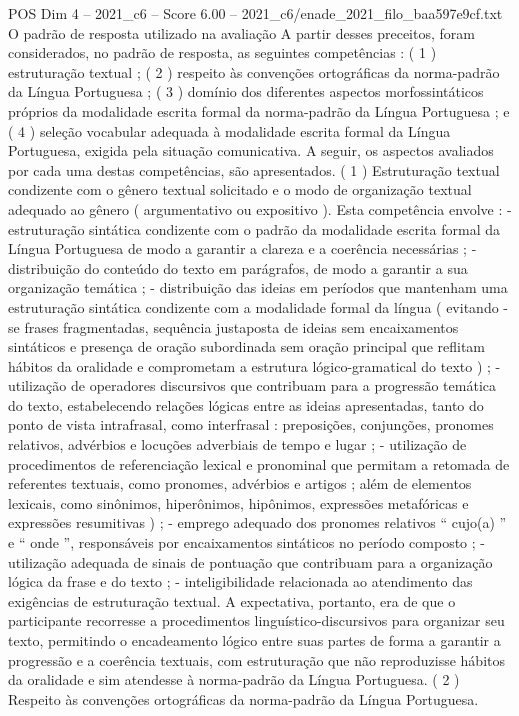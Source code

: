 \begin{textsample}{POS Dim 4 – 2021\_c6 – Score 6.00 – 2021\_c6/enade\_2021\_filo\_baa597e9cf.txt}
O padrão de resposta utilizado na avaliação A partir desses preceitos, foram considerados, no padrão de resposta, as seguintes competências : ( 1 ) estruturação textual ; ( 2 ) respeito às convenções ortográficas da norma-padrão da Língua Portuguesa ; ( 3 ) domínio dos diferentes aspectos morfossintáticos próprios da modalidade escrita formal da norma-padrão da Língua Portuguesa ; e ( 4 ) seleção vocabular adequada à modalidade escrita formal da Língua Portuguesa, exigida pela situação comunicativa.
A seguir, os aspectos avaliados por cada uma destas competências, são apresentados. ( 1 ) Estruturação textual condizente com o gênero textual solicitado e o modo de organização textual adequado ao gênero ( argumentativo ou expositivo ).
Esta competência envolve : - estruturação sintática condizente com o padrão da modalidade escrita formal da Língua Portuguesa de modo a garantir a clareza e a coerência necessárias ; - distribuição do conteúdo do texto em parágrafos, de modo a garantir a sua organização temática ; - distribuição das ideias em períodos que mantenham uma estruturação sintática condizente com a modalidade formal da língua ( evitando -se frases fragmentadas, sequência justaposta de ideias sem encaixamentos sintáticos e presença de oração subordinada sem oração principal que reflitam hábitos da oralidade e comprometam a estrutura lógico-gramatical do texto ) ; - utilização de operadores discursivos que contribuam para a progressão temática do texto, estabelecendo relações lógicas entre as ideias apresentadas, tanto do ponto de vista intrafrasal, como interfrasal : preposições, conjunções, pronomes relativos, advérbios e locuções adverbiais de tempo e lugar ; - utilização de procedimentos de referenciação lexical e pronominal que permitam a retomada de referentes textuais, como pronomes, advérbios e artigos ; além de elementos lexicais, como sinônimos, hiperônimos, hipônimos, expressões metafóricas e expressões resumitivas ) ; - emprego adequado dos pronomes relativos “ cujo(a) ” e “ onde ”, responsáveis por encaixamentos sintáticos no período composto ; - utilização adequada de sinais de pontuação que contribuam para a organização lógica da frase e do texto ; - inteligibilidade relacionada ao atendimento das exigências de estruturação textual.
A expectativa, portanto, era de que o participante recorresse a procedimentos linguístico-discursivos para organizar seu texto, permitindo o encadeamento lógico entre suas partes de forma a garantir a progressão e a coerência textuais, com estruturação que não reproduzisse hábitos da oralidade e sim atendesse à norma-padrão da Língua Portuguesa. ( 2 ) Respeito às convenções ortográficas da norma-padrão da Língua Portuguesa.

\end{textsample}
